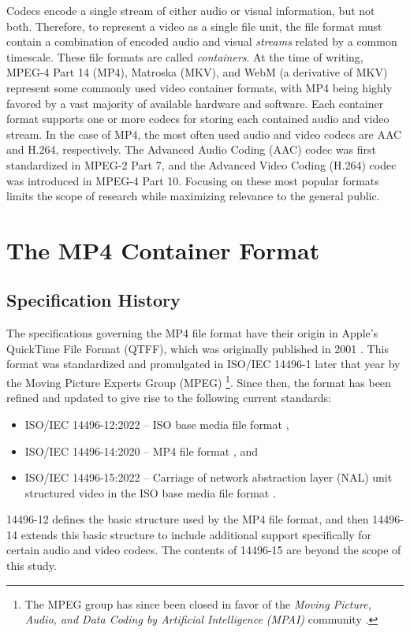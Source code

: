 Codecs encode a single stream of either audio or visual information, but not both. Therefore, to represent a video as a single file unit, the file format must contain a combination of encoded audio and visual \emph{streams} related by a common timescale. These file formats are called \emph{containers}. At the time of writing, MPEG-4 Part 14 (MP4), Matroska (MKV), and WebM (a derivative of MKV) represent some commonly used video container formats, with MP4 being highly favored by a vast majority of available hardware and software. Each container format supports one or more codecs for storing each contained audio and video stream. In the case of MP4, the most often used audio and video codecs are AAC and H.264, respectively. The Advanced Audio Coding (AAC) codec was first standardized in MPEG-2 Part 7, and the Advanced Video Coding (H.264) codec was introduced in MPEG-4 Part 10. Focusing on these most popular formats limits the scope of research while maximizing relevance to the general public.

\section{The MP4 Container Format}

\subsection{Specification History}

The specifications governing the MP4 file format have their origin in Apple's QuickTime File Format (QTFF), which was originally published in 2001 \cite{apple2001}. This format was standardized and promulgated in ISO/IEC 14496-1 \cite{iso14496-1:2001} later that year by the Moving Picture Experts Group (MPEG) \cite{mpeg}\footnote{The MPEG group has since been closed in favor of the \emph{Moving Picture, Audio, and Data Coding by Artificial Intelligence (MPAI)} community \cite{mpai}.}. Since then, the format has been refined and updated to give rise to the following current standards:
\begin{itemize}
	\item ISO/IEC 14496-12:2022 -- ISO base media file format \cite{iso14496-12:2022},
	\item ISO/IEC 14496-14:2020 -- MP4 file format \cite{iso14496-14:2020}, and
	\item ISO/IEC 14496-15:2022 -- Carriage of network abstraction layer (NAL) unit structured video in the ISO base media file format \cite{iso14496-15:2022}.
\end{itemize}
14496-12 defines the basic structure used by the MP4 file format, and then 14496-14 extends this basic structure to include additional support specifically for certain audio and video codecs. The contents of 14496-15 are beyond the scope of this study.

